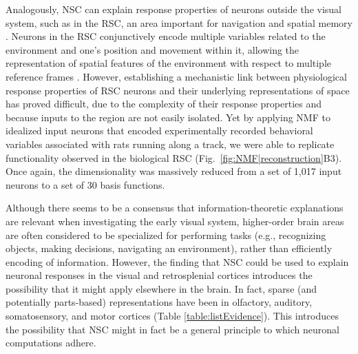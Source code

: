 Analogously, NSC can explain response properties
of neurons outside the visual system, 
such as in the \ac{RSC}, an area important for navigation and spatial memory \cite{Miller2014,Nelson2015,VannAggleton2009}.
Neurons in the \ac{RSC} conjunctively encode multiple variables related to 
the environment and one's position and movement within it,
allowing the representation of spatial features of the environment 
with respect to multiple reference frames \cite{AlexanderNitz2015}.
However, establishing a mechanistic link 
between physiological response properties of \ac{RSC} neurons 
and their underlying representations of space
has proved difficult,
due to the complexity of their response properties and because inputs to the region are not easily isolated.
Yet by applying \ac{NMF} to idealized input neurons that encoded 
experimentally recorded behavioral variables 
associated with rats running along a track, we were able to replicate
functionality observed in the biological \ac{RSC} (Fig.~\ref{fig:NMF|reconstruction}B3). Once again, the dimensionality was massively reduced from a set of 1,017 input neurons to a set of 30 basis functions.

Although there seems to be a consensus that information-theoretic explanations are relevant when investigating the early visual system,
higher-order brain areas are often considered to be specialized for
performing tasks
(e.g., recognizing objects, making decisions, navigating an environment),
rather than efficiently encoding of information.
However, the finding that \ac{NSC} could be used to explain
neuronal responses in the visual and retrosplenial cortices
introduces the possibility that it might apply elsewhere in the brain.
In fact, sparse
(and potentially parts-based)
representations have been in 
olfactory, auditory, somatosensory, 
and motor cortices
(Table \ref{table:listEvidence}). 
This introduces the possibility that \ac{NSC} might in fact
be a general principle to which neuronal computations adhere.

